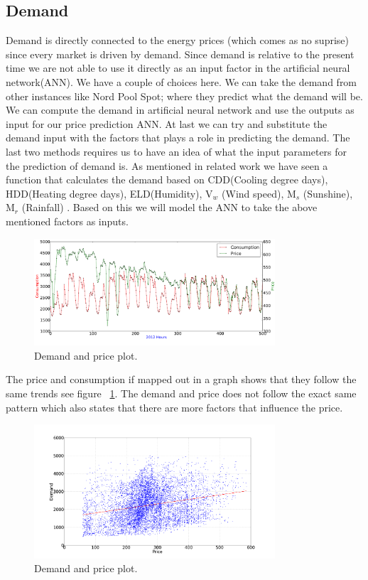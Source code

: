 \subsection{Demand}
Demand is directly connected to the energy prices (which comes as no suprise) since every market is driven by demand. Since demand is relative to the present time we are not able to use it directly as an input factor in the artificial neural network(ANN). We have a couple of choices here. We can take the demand from other instances like Nord Pool Spot; where they predict what the demand will be. We can compute the demand in artificial neural network and use the outputs as input for our price prediction ANN. At last we can try and substitute the demand input with the factors that plays a role in predicting the demand. The last two methods requires us to have an idea of what the input parameters for the prediction of demand is. As mentioned in related work we have seen a function that calculates the demand based on CDD(Cooling degree days), HDD(Heating degree days), ELD(Humidity), V$_w$ (Wind speed), M$_s$ (Sunshine), M$_r$ (Rainfall) \cite{19}. Based on this we will model the ANN to take the above mentioned factors as inputs.

\begin{figure}[H]
\centering
\includegraphics[width=0.8\textwidth ]{billeder/energy_price_plots/price_consump_graph.png}
\caption{Demand and price plot.}
\label{fig:consump_price_graph}
\end{figure}

The price and consumption if mapped out in a graph shows that they follow the same trends see figure ~\ref{fig:consump_price_graph}. The demand and price does not follow the exact same pattern which also states that there are more factors that influence the price.

\begin{figure}[H]
\centering
\includegraphics[width=0.8\textwidth ]{billeder/energy_price_plots/consump_price.png}
\caption{Demand and price plot.}
\label{fig:consump_price}
\end{figure}


